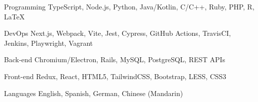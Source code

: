 

\begin{cvskills}

  \cvskill
    {Programming} %
    {TypeScript, Node.js, Python, Java/Kotlin, C/C++, Ruby, PHP, R, LaTeX} %

  \cvskill
    {DevOps} %
    {Next.js, Webpack, Vite, Jest, Cypress, GitHub Actions, TravisCI, Jenkins, Playwright, Vagrant} %

  \cvskill
    {Back-end} %
    {Chromium/Electron, Rails, MySQL, PostgreSQL, REST APIs} %

  \cvskill
    {Front-end} %
    {Redux, React, HTML5, TailwindCSS, Bootstrap, LESS, CSS3} %

  \cvskill
    {Languages} %
    {English, Spanish, German, Chinese (Mandarin)} %

\end{cvskills}

